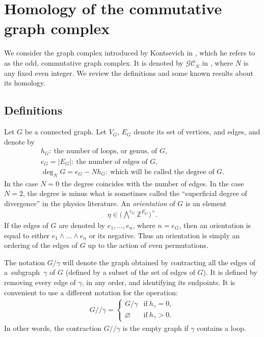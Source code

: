 \documentclass[pdftex]{sigma}%
\numberwithin{equation}{section}
\newcommand{\Z}{\mathbb Z}
\newcommand{\GC}{\mathcal{GC}}
\newcommand{\q}{/\!/}
\newcommand{\0}{\color{blue}{\mathsf{0}}}
\begin{document}
\renewcommand{\thefootnote}{\arabic{footnote}}
\setcounter{footnote}{0}

\section{Homology of the commutative graph complex}

We consider the graph complex introduced by Kontsevich in \cite{Kontsevich93}, which he refers to as the odd, commutative graph complex. It is denoted by $\GC_N$ in \cite{WillwacherGRT}, where $N$ is any fixed even integer. We review the definitions and some known results about its homology.
\subsection{Definitions}
Let $G$ be a connected graph. Let $V_G$, $E_G$ denote its set of vertices, and edges, and denote by
\begin{gather*}
h_G\colon\ \text{the number of loops, or genus, of } G,
 \\
e_G = |E_G|\colon\ \text{the number of edges of } G ,
\\
\deg_N G = e_G - N h_G\colon\ \text{which will be called the degree of } G .
\end{gather*}
In the case $N=0$ the degree coincides with the number of edges. In the case $N=2$,
the degree is minus what is sometimes called the ``superficial degree of divergence'' in the physics literature. An \emph{orientation} of $G$ is an element
\begin{gather*}
\eta \in \big(\textstyle{\bigwedge^{\!e_G}} \Z^{E_G} \big)^{\times} .
\end{gather*}
If the edges of $G$ are denoted by $e_1,\dots, e_n$, where $n=e_G$, then an orientation
is equal to either $e_1\wedge \dots \wedge e_n$ or its negative. Thus an orientation is simply an ordering of the edges of $G$ up to the action of even permutations.

The notation
 $G/\gamma$ will denote the graph obtained by contracting all the edges of a~sub\-graph~$\gamma$ of $G$
(defined by a subset of the set of edges of $G$). It is defined by removing every edge of $\gamma$, in any order, and identifying its endpoints.
It is convenient to use a different notation for the operation:
\begin{gather*}
G\q \gamma = \begin{cases}
G/\gamma& \text{if}\ h_{\gamma}=0,
\\
\varnothing & \text{if}\ h_{\gamma}>0.
\end{cases}
\end{gather*}
In other words, the contraction $G\q \gamma$ is the empty graph if $\gamma$ contains a loop.
\end{document}

